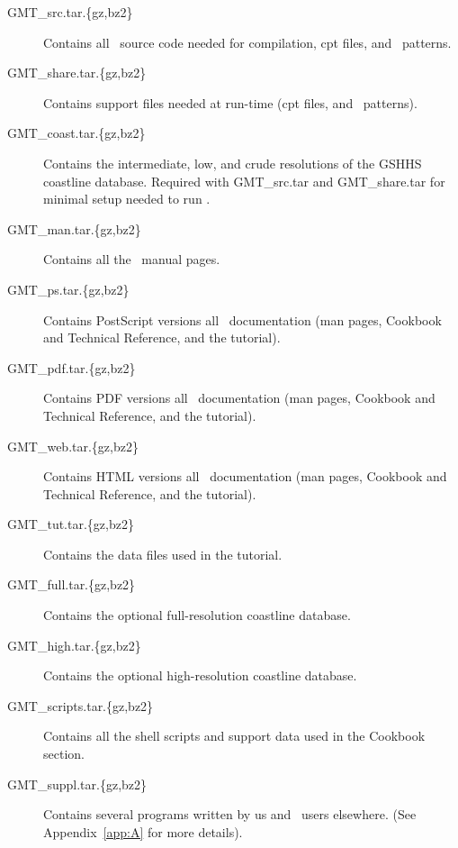 \begin{description}

\item[GMT\_src.tar.\{gz,bz2\}] Contains all \GMT\ source code needed for compilation, cpt files, and \PS\ patterns.

\item[GMT\_share.tar.\{gz,bz2\}] Contains support files needed at run-time (cpt files, and \PS\ patterns).

\item[GMT\_coast.tar.\{gz,bz2\}] Contains the intermediate,
low, and crude resolutions of the GSHHS coastline database.  Required
with GMT\_src.tar and GMT\_share.tar for minimal setup needed to run \GMT.

\item[GMT\_man.tar.\{gz,bz2\}] Contains all the \UNIX\ manual pages.

\item[GMT\_ps.tar.\{gz,bz2\}] Contains PostScript versions all \GMT\ documentation
(man pages, Cookbook and Technical Reference, and the tutorial).

\item[GMT\_pdf.tar.\{gz,bz2\}] Contains PDF versions all \GMT\ documentation
(man pages, Cookbook and Technical Reference, and the tutorial).

\item[GMT\_web.tar.\{gz,bz2\}] Contains HTML versions all \GMT\ documentation
(man pages, Cookbook and Technical Reference, and the tutorial).

\item[GMT\_tut.tar.\{gz,bz2\}] Contains the data files used in the tutorial.

\item[GMT\_full.tar.\{gz,bz2\}] Contains the optional
full-resolution coastline database.

\item[GMT\_high.tar.\{gz,bz2\}] Contains the optional
high-resolution coastline database.

\item[GMT\_scripts.tar.\{gz,bz2\}] Contains all the shell scripts
and support data used in the Cookbook section.

\item[GMT\_suppl.tar.\{gz,bz2\}] Contains several programs
written by us and \GMT\ users elsewhere. (See Appendix~\ref{app:A} for more
details).

\end{description}

